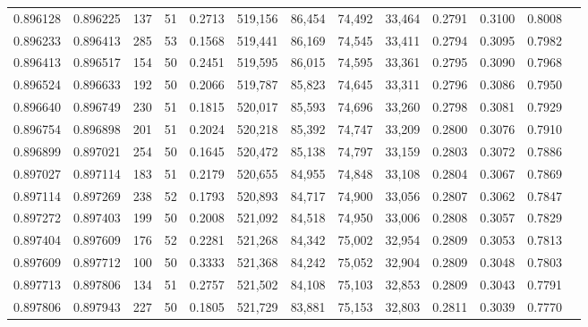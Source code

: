 \begin{tabular}{rrrrrrrrrrrrr}
0.896128 & 0.896225 &   137 &  51 &                                     0.2713 & 519,156 &  86,454 &  74,492 &  33,464 & 0.2791 & 0.3100 & 0.8008 \\
0.896233 & 0.896413 &   285 &  53 &                                     0.1568 & 519,441 &  86,169 &  74,545 &  33,411 & 0.2794 & 0.3095 & 0.7982 \\
0.896413 & 0.896517 &   154 &  50 &                                     0.2451 & 519,595 &  86,015 &  74,595 &  33,361 & 0.2795 & 0.3090 & 0.7968 \\
0.896524 & 0.896633 &   192 &  50 &                                     0.2066 & 519,787 &  85,823 &  74,645 &  33,311 & 0.2796 & 0.3086 & 0.7950 \\
0.896640 & 0.896749 &   230 &  51 &                                     0.1815 & 520,017 &  85,593 &  74,696 &  33,260 & 0.2798 & 0.3081 & 0.7929 \\
0.896754 & 0.896898 &   201 &  51 &                                     0.2024 & 520,218 &  85,392 &  74,747 &  33,209 & 0.2800 & 0.3076 & 0.7910 \\
0.896899 & 0.897021 &   254 &  50 &                                     0.1645 & 520,472 &  85,138 &  74,797 &  33,159 & 0.2803 & 0.3072 & 0.7886 \\
0.897027 & 0.897114 &   183 &  51 &                                     0.2179 & 520,655 &  84,955 &  74,848 &  33,108 & 0.2804 & 0.3067 & 0.7869 \\
0.897114 & 0.897269 &   238 &  52 &                                     0.1793 & 520,893 &  84,717 &  74,900 &  33,056 & 0.2807 & 0.3062 & 0.7847 \\
0.897272 & 0.897403 &   199 &  50 &                                     0.2008 & 521,092 &  84,518 &  74,950 &  33,006 & 0.2808 & 0.3057 & 0.7829 \\
0.897404 & 0.897609 &   176 &  52 &                                     0.2281 & 521,268 &  84,342 &  75,002 &  32,954 & 0.2809 & 0.3053 & 0.7813 \\
0.897609 & 0.897712 &   100 &  50 &                                     0.3333 & 521,368 &  84,242 &  75,052 &  32,904 & 0.2809 & 0.3048 & 0.7803 \\
0.897713 & 0.897806 &   134 &  51 &                                     0.2757 & 521,502 &  84,108 &  75,103 &  32,853 & 0.2809 & 0.3043 & 0.7791 \\
0.897806 & 0.897943 &   227 &  50 &                                     0.1805 & 521,729 &  83,881 &  75,153 &  32,803 & 0.2811 & 0.3039 & 0.7770 \\

\end{tabular}
